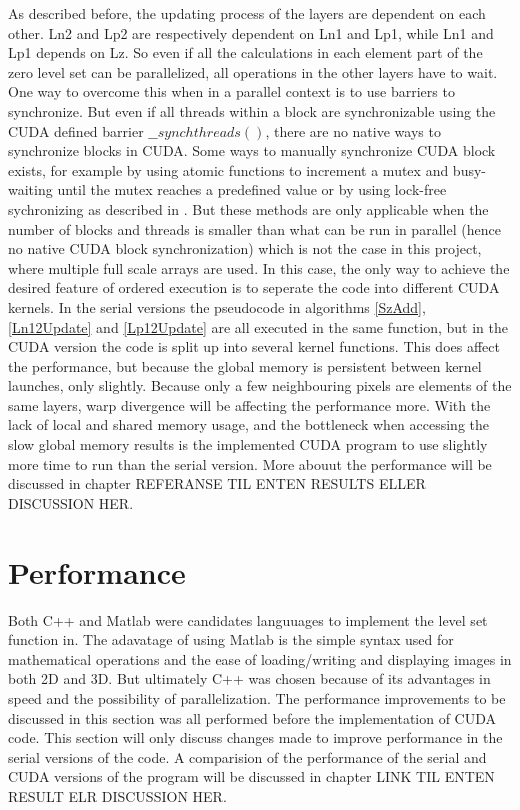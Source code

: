 As described before, the updating process of the layers are dependent on each other. Ln2 and Lp2 are respectively dependent on Ln1 and Lp1, while Ln1 and Lp1 depends on Lz. So even if all the calculations in each element part of the zero level set can be parallelized, all operations in the other layers have to wait. One way to overcome this when in a parallel context is to use barriers to synchronize. But even if all threads within a block are synchronizable using the CUDA defined barrier $\_\_synchthreads()$, there are no native ways to synchronize blocks in CUDA. Some ways to manually synchronize CUDA block exists, for example by using atomic functions to increment a mutex and busy-waiting until the mutex reaches a predefined value or by using lock-free sychronizing as described in \cite{shucai10}. But these methods are only applicable when the number of blocks and threads is smaller than what can be run in parallel (hence no native CUDA block synchronization) which is not the case in this project, where multiple full scale arrays are used. In this case, the only way to achieve the desired feature of ordered execution is to seperate the code into different CUDA kernels. In the serial versions the pseudocode in algorithms \ref{SzAdd}, \ref{Ln12Update} and \ref{Lp12Update} are all executed in the same function, but in the CUDA version the code is split up into several kernel functions. This does affect the performance, but because the global memory is persistent between kernel launches, only slightly. Because only a few neighbouring pixels are elements of the same layers, warp divergence will be affecting the performance more. With the lack of local and shared memory usage, and the bottleneck when accessing the slow global memory results is the implemented CUDA program to use slightly more time to run than the serial version. More abouut the performance will be discussed in chapter REFERANSE TIL ENTEN RESULTS ELLER DISCUSSION HER.

\section{Performance}
Both C++ and Matlab were candidates languuages to implement the level set function in. The adavatage of using Matlab is the simple syntax used for mathematical operations and the ease of loading/writing and displaying images in both 2D and 3D. But ultimately C++ was chosen because of its advantages in speed and the possibility of parallelization. The performance improvements to be discussed in this section was all performed before the implementation of CUDA code. This section will only discuss changes made to improve performance in the serial versions of the code. A comparision of the performance of the serial and CUDA versions of the program will be discussed in chapter LINK TIL ENTEN RESULT ELR DISCUSSION HER.

